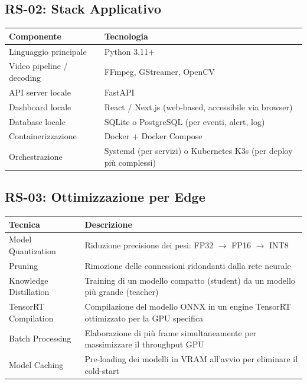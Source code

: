 \documentclass[a4paper, 12pt]{article}
\begin{document}
\subsection{RS-02: Stack Applicativo}

\begin{tabularx}{\textwidth}{lL}
    \toprule
    \textbf{Componente} & \textbf{Tecnologia} \\
    \midrule
    Linguaggio principale & Python 3.11+ \\
    Video pipeline / decoding & FFmpeg, GStreamer, OpenCV \\
    API server locale & FastAPI \\
    Dashboard locale & React / Next.js (web-based, accessibile via browser) \\
    Database locale & SQLite o PostgreSQL (per eventi, alert, log) \\
    Containerizzazione & Docker + Docker Compose \\
    Orchestrazione & Systemd (per servizi) o Kubernetes K3s (per deploy più complessi) \\
    \bottomrule
\end{tabularx}

\subsection{RS-03: Ottimizzazione per Edge}

\begin{tabularx}{\textwidth}{lL}
    \toprule
    \textbf{Tecnica} & \textbf{Descrizione} \\
    \midrule
    Model Quantization & Riduzione precisione dei pesi: FP32 $\rightarrow$ FP16 $\rightarrow$ INT8 \\
    Pruning & Rimozione delle connessioni ridondanti dalla rete neurale \\
    Knowledge Distillation & Training di un modello compatto (student) da un modello più grande (teacher) \\
    TensorRT Compilation & Compilazione del modello ONNX in un engine TensorRT ottimizzato per la GPU specifica \\
    Batch Processing & Elaborazione di più frame simultaneamente per massimizzare il throughput GPU \\
    Model Caching & Pre-loading dei modelli in VRAM all'avvio per eliminare il cold-start \\
    \bottomrule
\end{tabularx}
\end{document}

